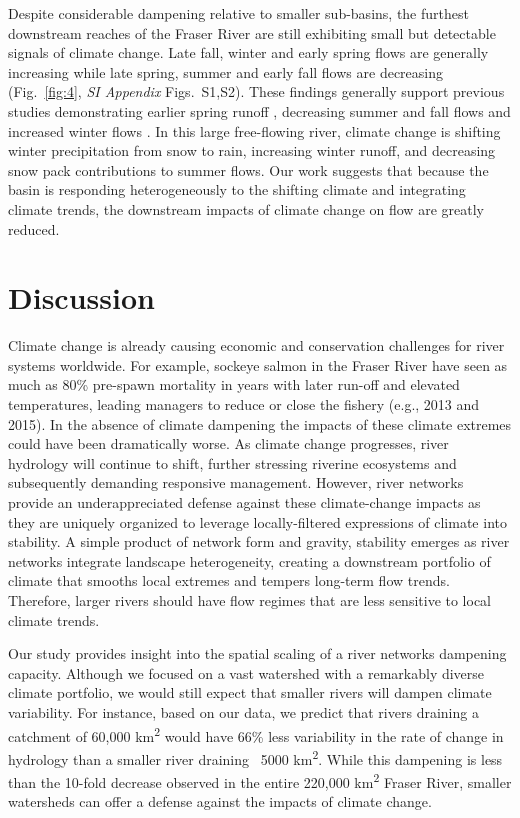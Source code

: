 \documentclass[9pt,twocolumn,twoside,lineno]{pnas-new}
\begin{document}
Despite considerable dampening relative to smaller sub-basins, the furthest downstream reaches of the Fraser River are still exhibiting small but detectable signals of climate change. Late fall, winter and early spring flows are generally increasing while late spring, summer and early fall flows are decreasing (Fig.~\ref{fig:4}, \textit{SI Appendix} Figs.~S1,S2). These findings generally support previous studies demonstrating earlier spring runoff \cite{Dery:2012}, decreasing summer and fall flows \cite{Stahl:2006} and increased winter flows \cite{Healey:2011}. In this large free-flowing river, climate change is shifting winter precipitation from snow to rain, increasing winter runoff, and decreasing snow pack contributions to summer flows. Our work suggests that because the basin is responding heterogeneously to the shifting climate and integrating climate trends, the downstream impacts of climate change on flow are greatly reduced. 

\section*{Discussion}
Climate change is already causing economic and conservation challenges for river systems worldwide\cite{Palmer:2009,Pecl:2017}. For example, sockeye salmon in the Fraser River have seen as much as 80\% pre-spawn mortality in years with later run-off and elevated temperatures, leading managers to reduce or close the fishery (e.g., 2013 and 2015). In the absence of climate dampening the impacts of these climate extremes could have been dramatically worse. As climate change progresses, river hydrology will continue to shift, further stressing riverine ecosystems and subsequently demanding responsive management. However, river networks provide an underappreciated defense against these climate-change impacts as they are uniquely organized to leverage locally-filtered expressions of climate into stability. A simple product of network form and gravity, stability emerges as river networks integrate landscape heterogeneity, creating a downstream portfolio of climate that smooths local extremes and tempers long-term flow trends. Therefore, larger rivers should have flow regimes that are less sensitive to local climate trends.

Our study provides insight into the spatial scaling of a river networks dampening capacity. Although we focused on a vast watershed with a remarkably diverse climate portfolio, we would still expect that smaller rivers will dampen climate variability. For instance, based on our data, we predict that rivers draining a catchment of 60,000 km\textsuperscript{2} would have 66\% less variability in the rate of change in hydrology than a smaller river draining ~5000 km\textsuperscript{2}. While this dampening is less than the 10-fold decrease observed in the entire 220,000 km\textsuperscript{2} Fraser River, smaller watersheds can offer a defense against the impacts of climate change.
\end{document}
